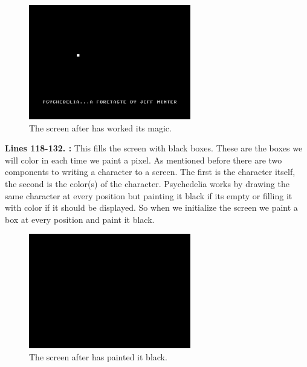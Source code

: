 \begin{figure}[H]
    \centering
      \includegraphics[height=5cm]{src/listing_commentary/foretaste.png}
  \caption*{The screen after  has worked its magic.}
\end{figure}

\bigskip
\bigskip
\bigskip
\bigskip
\textbf{Lines 118-132. :} This fills the screen with black boxes. These are the boxes we will color in each time we paint a pixel.
As mentioned before there are two components to writing a character to a screen. The first is the character
itself, the second is the color(s) of the character. Psychedelia works by drawing the same character at every
position but painting it black if its empty or filling it with color if it should be displayed. So when
we initialize the screen we paint a box at every position and paint it black.

\begin{figure}[H]
    \centering
      \includegraphics[height=5cm]{src/listing_commentary/black.png}
  \caption*{The screen after  has painted it black.}
\end{figure}

